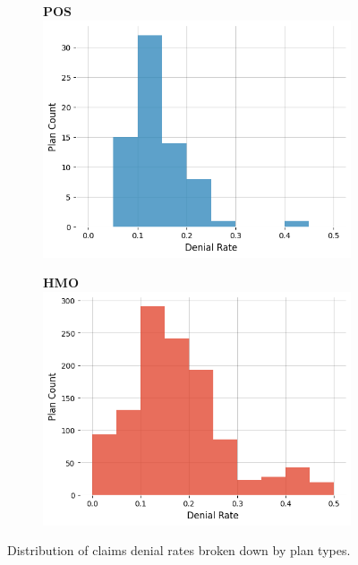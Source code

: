 \documentclass[12pt, a4paper,twoside,parskip=full]{report}
\theoremstyle{plain} %
\theoremstyle{definition} %
\theoremstyle{remark} %
\numberwithin{equation}{chapter}
\begin{document}
\begin{figure}
\begin{subfigure}[t]{0.49\textwidth}
					\end{subfigure}
					\hfill
					\vspace{1em}
					\begin{subfigure}[t]{0.49\textwidth}
						\centering
						\textbf{POS}
						\includegraphics[width=\textwidth]{images/cms_puf/POS_dist.png}
					\end{subfigure}
					\hfill
					\begin{subfigure}[t]{0.49\textwidth}
						\centering
						\textbf{HMO}
						\includegraphics[width=\textwidth]{images/cms_puf/HMO_dist.png}
					\end{subfigure}
				
					\caption{Distribution of claims denial rates broken down by plan types.}
					\label{federaldenialratesbyplantype}
			\end{figure}
		
\end{document}
